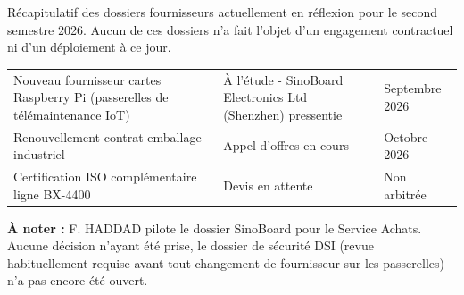 \documentclass[11pt]{article}
\begin{document}
\lhElecarm
{}

Récapitulatif des dossiers fournisseurs actuellement en réflexion pour le second semestre 2026. Aucun de ces dossiers n'a fait l'objet d'un engagement contractuel ni d'un déploiement à ce jour.

\vspace{6pt}
\begin{tabularx}{\linewidth}{@{}Y p{4cm} p{2.6cm}@{}}
 &  & \\[2pt]
\hline
Nouveau fournisseur cartes Raspberry Pi (passerelles de télémaintenance IoT) & À l'étude - SinoBoard Electronics Ltd (Shenzhen) pressentie & Septembre 2026\\
Renouvellement contrat emballage industriel & Appel d'offres en cours & Octobre 2026\\
Certification ISO complémentaire ligne BX-4400 & Devis en attente & Non arbitrée\\
\end{tabularx}

\vspace{10pt}
\begin{quotebox}
\textbf{À noter :} F. HADDAD pilote le dossier SinoBoard pour le Service Achats. Aucune décision n'ayant été prise, le dossier de sécurité DSI (revue habituellement requise avant tout changement de fournisseur sur les passerelles) n'a pas encore été ouvert.
\end{quotebox}
\docfooter
\end{document}
